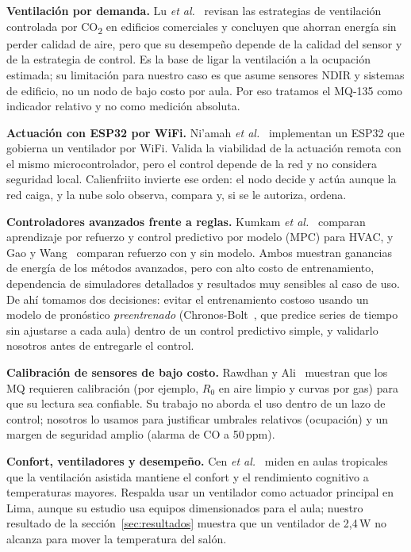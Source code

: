 \documentclass[10pt,a4paper]{article}
\newcommand{\COd}{CO\textsubscript{2}}
\begin{document}
\textbf{Ventilación por demanda.} Lu \emph{et al.}~\cite{lu} revisan las estrategias de ventilación controlada por \COd{} en edificios comerciales y concluyen que ahorran energía sin perder calidad de aire, pero que su desempeño depende de la calidad del sensor y de la estrategia de control. Es la base de ligar la ventilación a la ocupación estimada; su limitación para nuestro caso es que asume sensores NDIR y sistemas de edificio, no un nodo de bajo costo por aula. Por eso tratamos el MQ-135 como indicador relativo y no como medición absoluta.

\textbf{Actuación con ESP32 por WiFi.} Ni'amah \emph{et al.}~\cite{niamah} implementan un ESP32 que gobierna un ventilador por WiFi. Valida la viabilidad de la actuación remota con el mismo microcontrolador, pero el control depende de la red y no considera seguridad local. Calienfriito invierte ese orden: el nodo decide y actúa aunque la red caiga, y la nube solo observa, compara y, si se le autoriza, ordena.

\textbf{Controladores avanzados frente a reglas.} Kumkam \emph{et al.}~\cite{kumkam} comparan aprendizaje por refuerzo y control predictivo por modelo (MPC) para HVAC, y Gao y Wang~\cite{gao} comparan refuerzo con y sin modelo. Ambos muestran ganancias de energía de los métodos avanzados, pero con alto costo de entrenamiento, dependencia de simuladores detallados y resultados muy sensibles al caso de uso. De ahí tomamos dos decisiones: evitar el entrenamiento costoso usando un modelo de pronóstico \emph{preentrenado} (Chronos-Bolt~\cite{chronos}, que predice series de tiempo sin ajustarse a cada aula) dentro de un control predictivo simple, y validarlo nosotros antes de entregarle el control.

\textbf{Calibración de sensores de bajo costo.} Rawdhan y Ali~\cite{rawdhan} muestran que los MQ requieren calibración (por ejemplo, $R_0$ en aire limpio y curvas por gas) para que su lectura sea confiable. Su trabajo no aborda el uso dentro de un lazo de control; nosotros lo usamos para justificar umbrales relativos (ocupación) y un margen de seguridad amplio (alarma de CO a 50\,ppm).

\textbf{Confort, ventiladores y desempeño.} Cen \emph{et al.}~\cite{cen} miden en aulas tropicales que la ventilación asistida mantiene el confort y el rendimiento cognitivo a temperaturas mayores. Respalda usar un ventilador como actuador principal en Lima, aunque su estudio usa equipos dimensionados para el aula; nuestro resultado de la sección~\ref{sec:resultados} muestra que un ventilador de 2,4\,W no alcanza para mover la temperatura del salón.
\end{document}
